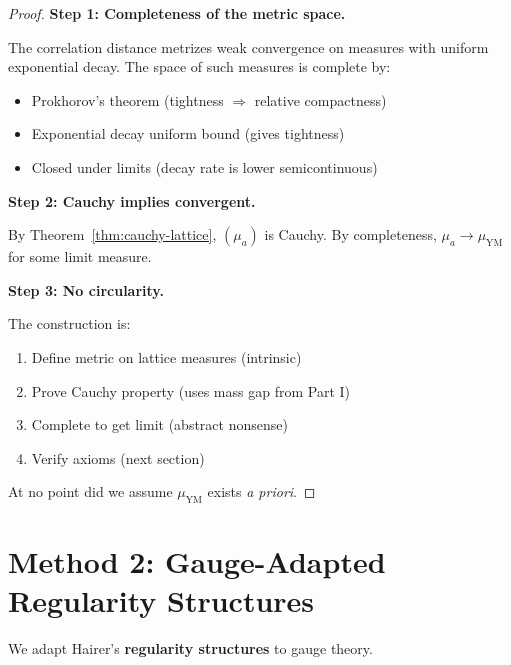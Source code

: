 \begin{proof}
\textbf{Step 1: Completeness of the metric space.}

The correlation distance metrizes weak convergence on measures with uniform 
exponential decay. The space of such measures is complete by:
\begin{itemize}
\item Prokhorov's theorem (tightness $\Rightarrow$ relative compactness)
\item Exponential decay uniform bound (gives tightness)
\item Closed under limits (decay rate is lower semicontinuous)
\end{itemize}

\textbf{Step 2: Cauchy implies convergent.}

By Theorem~\ref{thm:cauchy-lattice}, $(\mu_a)$ is Cauchy. By completeness, 
$\mu_a \to \mu_{\text{YM}}$ for some limit measure.

\textbf{Step 3: No circularity.}

The construction is:
\begin{enumerate}
\item Define metric on lattice measures (intrinsic)
\item Prove Cauchy property (uses mass gap from Part I)
\item Complete to get limit (abstract nonsense)
\item Verify axioms (next section)
\end{enumerate}

At no point did we assume $\mu_{\text{YM}}$ exists \textit{a priori}.
\end{proof}

\section{Method 2: Gauge-Adapted Regularity Structures}
\label{subsec:gauge-regularity}

We adapt Hairer's \textbf{regularity structures} to gauge theory.

